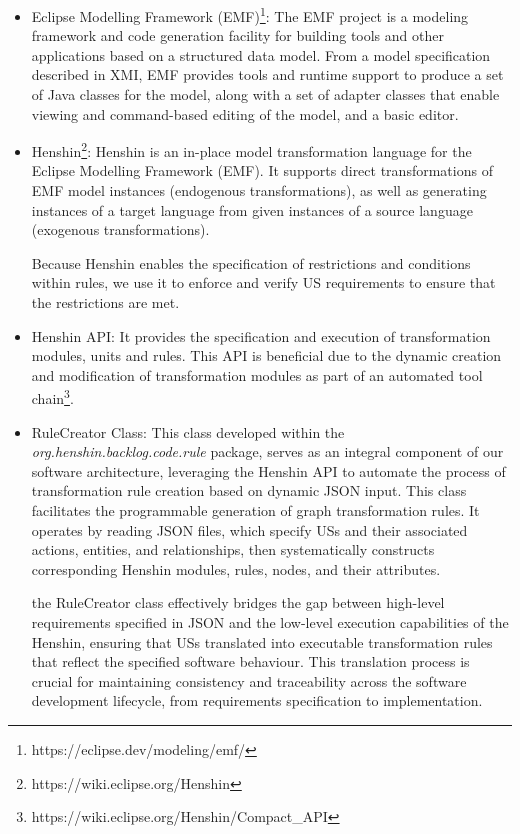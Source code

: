 \begin{itemize}
	\item Eclipse Modelling Framework (EMF)\footnote{https://eclipse.dev/modeling/emf/}: The EMF project is a modeling framework and code generation facility for building tools and other applications based on a structured data model. From a model specification described in XMI, EMF provides tools and runtime support to produce a set of Java classes for the model, along with a set of adapter classes that enable viewing and command-based editing of the model, and a basic editor.
	
	\item Henshin\footnote{https://wiki.eclipse.org/Henshin}: Henshin is an in-place model transformation language for the Eclipse Modelling Framework (EMF). It supports direct transformations of EMF model instances (endogenous transformations), as well as generating instances of a target language from given instances of a source language (exogenous transformations).
	
	Because Henshin enables the specification of restrictions and conditions within rules, we use it to enforce and verify US requirements to ensure that the restrictions are met.
		
	\item Henshin API: It provides the specification and execution of transformation modules, units and rules. This API is beneficial due to the dynamic creation and modification of transformation modules as part of an automated tool chain\footnote{https://wiki.eclipse.org/Henshin/Compact\_API}.
	
	\item RuleCreator Class: This class developed within the \textit{org.henshin.backlog.code.rule} package, serves as an integral component of our software architecture, leveraging the Henshin API to automate the process of transformation rule creation based on dynamic JSON input. This class facilitates the programmable generation of graph transformation rules. It operates by reading JSON files, which specify USs and their associated actions, entities, and relationships, then systematically constructs corresponding Henshin modules, rules, nodes, and their attributes.
	
	the RuleCreator class effectively bridges the gap between high-level requirements specified in JSON and the low-level execution capabilities of the Henshin, ensuring that USs translated into executable transformation rules that reflect the specified software behaviour. This translation process is crucial for maintaining consistency and traceability across the software development lifecycle, from requirements specification to implementation.
	

\end{itemize}
